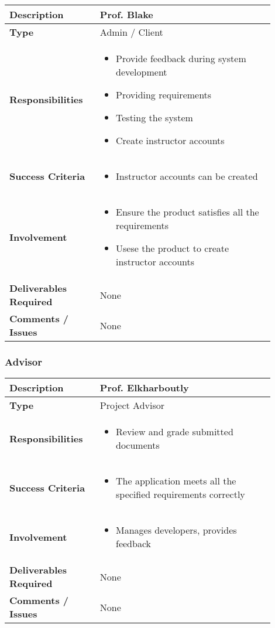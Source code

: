 \documentclass{article}
\begin{document}
\begin{tabular}{| p{0.3\linewidth} | p{0.6\linewidth} |}
  \hline
  \textbf{Description}& Prof. Blake\\
  \hline
  \textbf{Type} & Admin / Client\\
  \hline
  \textbf{Responsibilities} & \begin{itemize}
    \item Provide feedback during system development
    \item Providing requirements
    \item Testing the system
    \item Create instructor accounts
  \end{itemize}\\
  \hline
  \textbf{Success Criteria}& \begin{itemize}
    \item Instructor accounts can be created
  \end{itemize}\\
  \hline
  \textbf{Involvement} & \begin{itemize}
    \item Ensure the product satisfies all the requirements
    \item Usese the product to create instructor accounts
  \end{itemize} \\
  \hline
  \textbf{Deliverables Required}& None \\
  \hline
  \textbf{Comments / Issues} & None \\
  \hline
\end{tabular}

\subsubsection{Advisor}

\begin{tabular}{| p{0.3\linewidth} | p{0.6\linewidth} |}
  \hline
  \textbf{Description}& Prof. Elkharboutly \\
  \hline
  \textbf{Type} & Project Advisor\\
  \hline
  \textbf{Responsibilities} & \begin{itemize}
    \item Review and grade submitted documents
  \end{itemize} \\
  \hline
  \textbf{Success Criteria}& \begin{itemize}
    \item The application meets all the specified requirements correctly
  \end{itemize}\\
  \hline
  \textbf{Involvement} & \begin{itemize}
    \item Manages developers, provides feedback
  \end{itemize} \\
  \hline
  \textbf{Deliverables Required}& None \\
  \hline
  \textbf{Comments / Issues} & None \\
  \hline
\end{tabular}
\end{document}
